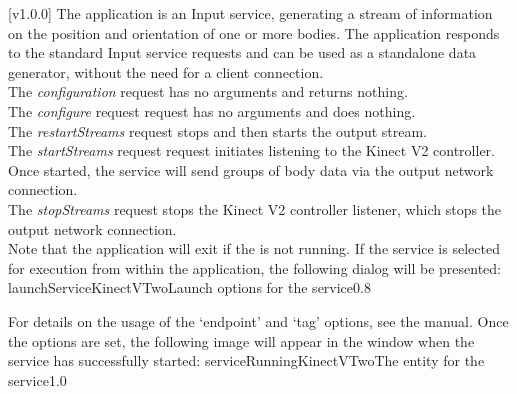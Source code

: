 [v1.0.0]
The  application is an Input service,
generating a stream of information on the position and orientation of one or more bodies.
The application responds to the standard Input service requests and can be used as a
standalone data generator, without the need for a client connection.\\

The \emph{configuration} request has no arguments and returns nothing.\\

The \emph{configure} request request has no arguments and does nothing.\\

The \emph{restartStreams} request stops and then starts the output stream.\\

The \emph{startStreams} request request initiates listening to the Kinect V2 controller.
Once started, the service will send groups of body data via the output \yarp{} network
connection.\\

The \emph{stopStreams} request stops the Kinect V2 controller listener, which stops the
output \yarp{} network connection.\\ 

Note that the application will exit if the \emph{\RS} is not running.
\insertAppParameters
\insertTagDescription{\KVtwoI}
\insertInputServiceComment
\condPage
\insertStandardServiceCommands
\secondaryEnd
\condPage
{}
If the service is selected for execution from within the \emph{\MMMU} application, the
following dialog will be presented:
%
{launchServiceKinectVTwo}{Launch options for the \emph{\KVtwoI} service}{0.8}

For details on the usage of the `endpoint' and `tag' options, see the \emph{\MMMU} manual.
Once the options are set, the following image will appear in the \emph{\MMMU} window when
the service has successfully started:
%
{serviceRunningKinectVTwo}{The \emph{\MMMU} entity for the \emph{\KVtwoI} service}{1.0}
\secondaryEnd
\primaryEnd{}
